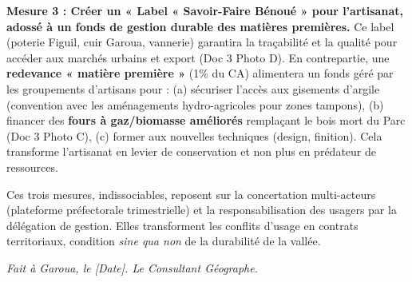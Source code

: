 \documentclass[11pt]{article}
\newcommand{\cle}[1]{{\popxbold\color{popdark}#1}}
\begin{document}
\begin{exoresolu}
\textbf{Mesure 3 : Créer un « Label « Savoir-Faire Bénoué » pour l'artisanat, adossé à un fonds de gestion durable des matières premières.} Ce label (poterie Figuil, cuir Garoua, vannerie) garantira la traçabilité et la qualité pour accéder aux marchés urbains et export (Doc 3 Photo D). En contrepartie, une \textbf{redevance « matière première »} (1\% du CA) alimentera un fonds géré par les groupements d'artisans pour : (a) sécuriser l'accès aux gisements d'argile (convention avec les aménagements hydro-agricoles pour zones tampons), (b) financer des \textbf{fours à gaz/biomasse améliorés} remplaçant le bois mort du Parc (Doc 3 Photo C), (c) former aux nouvelles techniques (design, finition). Cela transforme l'artisanat en levier de conservation et non plus en prédateur de ressources.

Ces trois mesures, indissociables, reposent sur la \cle{concertation multi-acteurs} (plateforme préfectorale trimestrielle) et la \cle{responsabilisation des usagers} par la délégation de gestion. Elles transforment les conflits d'usage en contrats territoriaux, condition \textit{sine qua non} de la durabilité de la vallée.

\textit{Fait à Garoua, le [Date]. Le Consultant Géographe.}
\end{exoresolu}
\end{document}
